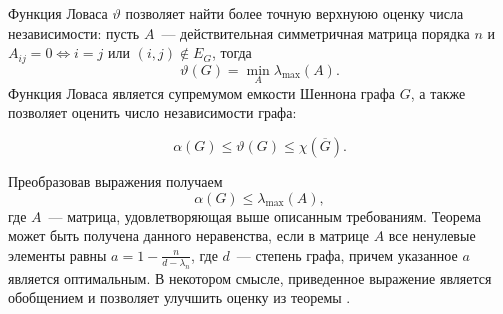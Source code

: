 Функция Ловаса $\vartheta$ позволяет найти более
точную верхнуюю оценку числа независимости: пусть $A$~--- действительная
симметричная матрица порядка $n$ и $A_{ij} = 0 \Leftrightarrow i=j$ или
$(i,j) \notin E_G$, тогда
\begin{equation}
    \vartheta(G) = \min_A \lambda_{\max}(A).
\end{equation}
Функция Ловаса является супремумом емкости Шеннона графа $G$, а также
позволяет оценить число независимости графа:
\begin{theorem}
    \begin{equation}
        \alpha(G) \leq \vartheta(G) \leq \chi(\overline G).
    \end{equation}
\end{theorem}

Преобразовав выражения  получаем
\begin{equation}
    \alpha(G) \leq \lambda_{\max}(A),
\end{equation} где $A$~--- матрица, удовлетворяющая выше описанным требованиям.
Теорема  может быть получена данного неравенства,
если в матрице $A$ все ненулевые элементы равны $a=1-\frac{n}{d-\lambda_n}$,
где $d$~--- степень графа, причем указанное $a$ является оптимальным.
В некотором смысле, приведенное выражение является обобщением и позволяет
улучшить оценку из теоремы .

